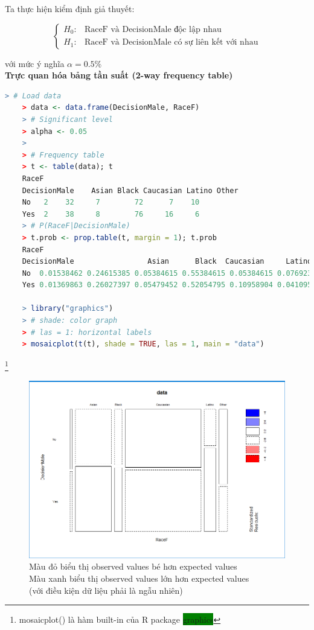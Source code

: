 \documentclass[a4paper,12pt]{article}
\begin{document}
	Ta thực hiện kiểm định giả thuyết:
	
	\begin{equation*}
	\begin{cases}
	H_0: & \text{RaceF và DecisionMale độc lập nhau}\\
	H_1: & \text{RaceF và DecisionMale có sự liên kết với nhau}
	\end{cases}
	\end{equation*}
	
	với mức ý nghĩa $\alpha = 0.5\%$\\
	
	\textbf{Trực quan hóa bảng tần suất (2-way frequency table)}
	
	\begin{lstlisting}[language=R]
	> # Load data
	> data <- data.frame(DecisionMale, RaceF)
	> # Significant level
	> alpha <- 0.05
	> 
	> # Frequency table
	> t <- table(data); t
	RaceF
	DecisionMale    Asian Black Caucasian Latino Other
	No   2    32     7        72      7    10
	Yes  2    38     8        76     16     6
	> # P(RaceF|DecisionMale)
	> t.prob <- prop.table(t, margin = 1); t.prob
	RaceF
	DecisionMale                 Asian      Black  Caucasian     Latino      Other
	No  0.01538462 0.24615385 0.05384615 0.55384615 0.05384615 0.07692308
	Yes 0.01369863 0.26027397 0.05479452 0.52054795 0.10958904 0.04109589
	
	> library("graphics")
	> # shade: color graph
	> # las = 1: horizontal labels
	> mosaicplot(t(t), shade = TRUE, las = 1, main = "data")
	\end{lstlisting}
	\footnote{mosaicplot() là hàm built-in của R package \colorbox{green}{graphics}}
	
	\begin{figure}[H]
		\centering
		\includegraphics[width=1.0\linewidth]{barchart}
		\caption{Màu đỏ biểu thị observed values bé hơn expected values\\ Màu xanh biểu thị observed values lớn hơn expected values\\ (với điều kiện dữ liệu phải là ngẫu nhiên)}
		\label{fig:barchart}
	\end{figure}
	
\end{document}

